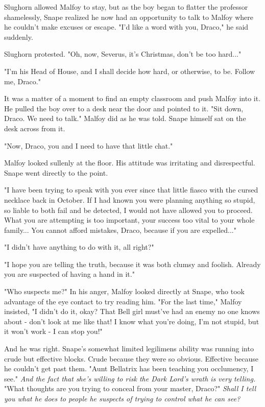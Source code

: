 \documentclass[a4paper,11pt]{article}
\begin{document}
Slughorn allowed Malfoy to stay, but as the boy began to flatter the professor shamelessly, Snape realized he now had an opportunity to talk to Malfoy where he couldn't make excuses or escape. "I'd like a word with you, Draco," he said suddenly.

Slughorn protested. "Oh, now, Severus, it's Christmas, don't be too hard..."

"I'm his Head of House, and I shall decide how hard, or otherwise, to be. Follow me, Draco."

It was a matter of a moment to find an empty classroom and push Malfoy into it. He pulled the boy over to a desk near the door and pointed to it. "Sit down, Draco. We need to talk." Malfoy did as he was told. Snape himself sat on the desk across from it.

"Now, Draco, you and I need to have that little chat."

Malfoy looked sullenly at the floor. His attitude was irritating and disrespectful. Snape went directly to the point.

"I have been trying to speak with you ever since that little fiasco with the cursed necklace back in October. If I had known you were planning anything so stupid, so liable to both fail and be detected, I would not have allowed you to proceed. What you are attempting is too important, your success too vital to your whole family... You cannot afford mistakes, Draco, because if you are expelled..."

"I didn't have anything to do with it, all right?"

"I hope you are telling the truth, because it was both clumsy and foolish. Already you are suspected of having a hand in it."

"Who suspects me?" In his anger, Malfoy looked directly at Snape, who took advantage of the eye contact to try reading him. "For the last time," Malfoy insisted, "I didn't do it, okay? That Bell girl must've had an enemy no one knows about - don't look at me like that! I know what you're doing, I'm not stupid, but it won't work - I can stop you!"

And he was right. Snape's somewhat limited legilimens ability was running into crude but effective blocks. Crude because they were so obvious. Effective because he couldn't get past them. "Aunt Bellatrix has been teaching you occlumency, I see." \emph{And the fact that she's willing to risk the Dark Lord's wrath is very telling.} "What thoughts are you trying to conceal from your master, Draco?" \emph{Shall I tell you what he does to people he suspects of trying to control what he can see?}
\end{document}
